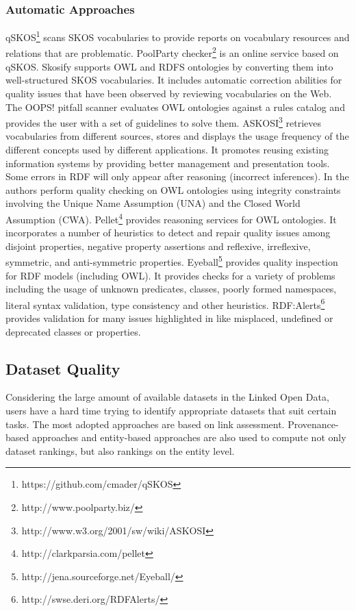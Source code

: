 \documentclass[onecolumn, crcready]{iosart2c}
\begin{document}
\subsubsection{Automatic Approaches}

qSKOS\footnote{https://github.com/cmader/qSKOS} \cite{Mader2012} scans SKOS vocabularies to provide reports on vocabulary resources and relations that are problematic. PoolParty checker\footnote{http://www.poolparty.biz/} is an online service based on qSKOS. Skosify \cite{Suominen:2012:IQS:2413941.2413985} supports OWL and RDFS ontologies by converting them into well-structured SKOS vocabularies. It includes automatic correction abilities for quality issues that have been observed by reviewing vocabularies on the Web. The OOPS! pitfall scanner \cite{oops} evaluates OWL ontologies against a rules catalog and provides the user with a set of guidelines to solve them. ASKOSI\footnote{http://www.w3.org/2001/sw/wiki/ASKOSI} retrieves vocabularies from different sources, stores and displays the usage frequency of the different concepts used by different applications. It promotes reusing existing information systems by providing better management and presentation tools.\\ Some errors in RDF will only appear after reasoning (incorrect inferences). In \cite{conf/owled/SirinSW08}\cite{conf/hicss/TaoDM09} the authors perform quality checking on OWL ontologies using integrity constraints involving the Unique Name Assumption (UNA) and the Closed World Assumption (CWA). Pellet\footnote{http://clarkparsia.com/pellet} provides reasoning services for OWL ontologies. It incorporates a number of heuristics to detect and repair quality issues among disjoint properties, negative property assertions and reflexive, irreflexive, symmetric, and anti-symmetric properties. Eyeball\footnote{http://jena.sourceforge.net/Eyeball/} provides quality inspection for RDF models (including OWL). It provides checks for a variety of problems including the usage of unknown predicates, classes, poorly formed namespaces, literal syntax validation, type consistency and other heuristics. RDF:Alerts\footnote{http://swse.deri.org/RDFAlerts/} provides validation for many issues highlighted in \cite{Hogan2010} like misplaced, undefined or deprecated classes or properties.\\


\subsection{Dataset Quality}
Considering the large amount of available datasets in the Linked Open Data, users have a hard time trying to identify appropriate datasets that suit certain tasks. The most adopted approaches are based on link assessment. Provenance-based approaches and entity-based approaches are also used to compute not only dataset rankings, but also rankings on the entity level.\\
\end{document}
